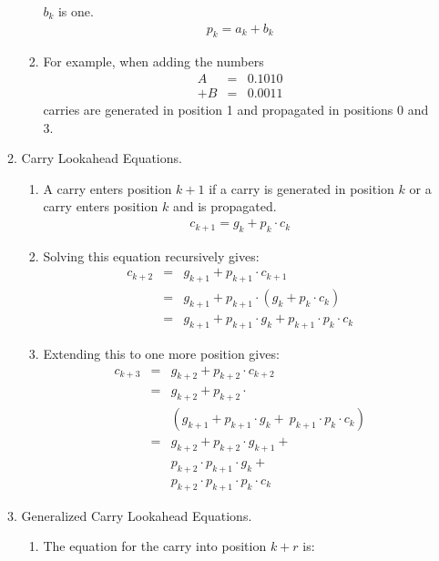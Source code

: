 \documentclass[times, twocolumn, 10pt]{article}
\begin{document}
\begin{enumerate}
\begin{enumerate}
\begin{enumerate}
      $b_{k}$ is one. 
      \begin{eqnarray}
	p_{k} = a_{k} + b_{k}      
      \end{eqnarray}
    \item For example, when adding the numbers 
      \begin{eqnarray*}
        A  & = & 0.1010 \\
        + B  & = & 0.0011
      \end{eqnarray*}
      carries are generated in position 1 and propagated in positions
      0 and 3. 
    \end{enumerate}
  \item Carry Lookahead Equations. 
    \begin{enumerate}
    \item A carry enters position $k+1$ if a carry is generated in 
      position $k$ or a carry enters position $k$ and is propagated. 
      \begin{eqnarray*}
	c_{k+1} = g_{k} + p_{k} \cdot c_{k} 
      \end{eqnarray*}
    \item Solving this equation recursively gives:
      \begin{eqnarray*}
	c_{k+2} & = & g_{k+1} + p_{k+1} \cdot c_{k+1} \\
	& = & g_{k+1} + p_{k+1} \cdot (g_{k} + p_{k}
	\cdot c_{k}) \\
	& = & g_{k+1} + p_{k+1} \cdot g_{k} + p_{k+1}
	\cdot p_{k} \cdot c_{k}
      \end{eqnarray*}
    \item Extending this to one more position gives:
      \begin{eqnarray*}
	c_{k+3} & = & g_{k+2} + p_{k+2} \cdot c_{k+2} \\
	& = & g_{k+2} + p_{k+2} \cdot \\
        & & (g_{k+1} + p_{k+1} \cdot g_{k} + \
	p_{k+1} \cdot p_{k} \cdot c_{k}) \\
	& = & g_{k+2} + p_{k+2} \cdot g_{k+1} + \\
        & & p_{k+2} \cdot p_{k+1} \cdot g_{k} + \\
        & & p_{k+2} \cdot p_{k+1} \cdot p_{k} \cdot c_{k} 
      \end{eqnarray*}
    \end{enumerate}
  \item Generalized Carry Lookahead Equations. 
    \begin{enumerate}
    \item The equation for the carry into position $k+r$ is:

\end{enumerate}
\end{enumerate}
\end{enumerate}
\end{document}
